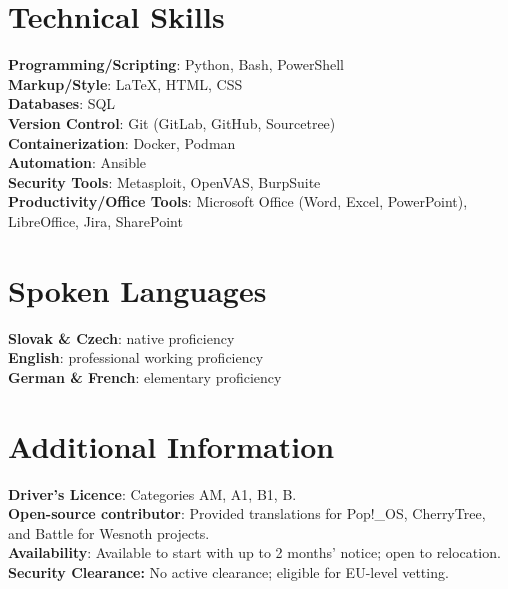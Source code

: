 \documentclass[letterpaper,11pt]{article}
\begin{document}
%
\section{Technical Skills}
 \begin{itemize}[leftmargin=0.15in, label={}]
    \small{\item{
     \textbf{Programming/Scripting}{: Python, Bash, PowerShell} \\
     \textbf{Markup/Style}{: LaTeX, HTML, CSS} \\
     \textbf{Databases}{: SQL} \\
     \textbf{Version Control}{: Git (GitLab, GitHub, Sourcetree) } \\
     \textbf{Containerization}{: Docker, Podman } \\
     \textbf{Automation}{: Ansible } \\
     \textbf{Security Tools}{: Metasploit, OpenVAS, BurpSuite } \\
     \textbf{Productivity/Office Tools}{: Microsoft Office (Word, Excel, PowerPoint), LibreOffice, Jira, SharePoint } \\
    }}
 \end{itemize}

\section{Spoken Languages}
 \begin{itemize}[leftmargin=0.15in, label={}]
    \small{\item{
     \textbf{Slovak \& Czech}{: native proficiency} \\
     \textbf{English}{: professional working proficiency} \\
     \textbf{German \& French}{: elementary proficiency} \\
    }}
 \end{itemize}

\section{Additional Information}
 \begin{itemize}[leftmargin=0.15in, label={}]
    \small{\item{
     \textbf{Driver's Licence}{: Categories AM, A1, B1, B.} \\
     \textbf{Open-source contributor}{: Provided translations for Pop!\_OS, CherryTree, and Battle for Wesnoth projects.} \\
     \textbf{Availability}{: Available to start with up to 2 months’ notice; open to relocation.} \\
     \textbf{Security Clearance:} No active clearance; eligible for EU-level vetting. \\
    }}
 \end{itemize}
\end{document}
